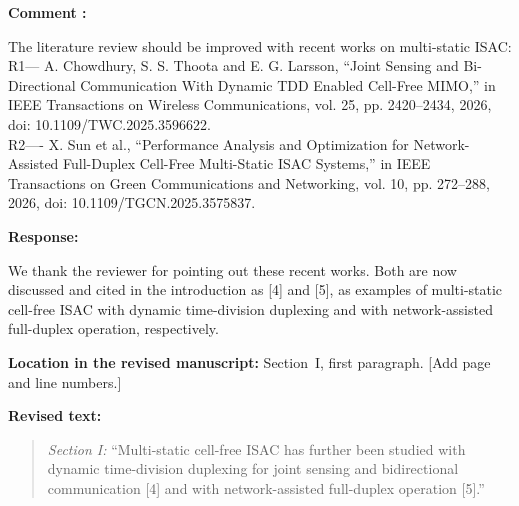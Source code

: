 \documentclass[a4paper,12pt]{article}
\newcounter{reviewcomment}
\newenvironment{reviewcomment}{%
  \stepcounter{reviewcomment}%
  \begin{shaded}
  \textbf{Comment \thereviewcomment:}\par
}{\end{shaded}}
\newenvironment{response}{\par\textbf{Response:}\par}{\par}
\newcommand{\revisionlocation}[1]{\par\textbf{Location in the revised manuscript:} #1\par}
\newenvironment{revisedtext}{%
  \par\textbf{Revised text:}\begin{quote}\color{red}
}{\end{quote}}
\begin{document}
\begin{reviewcomment}
The literature review should be improved with recent works on multi-static
ISAC:\\
R1--- A. Chowdhury, S. S. Thoota and E. G. Larsson, ``Joint Sensing and
Bi-Directional Communication With Dynamic TDD Enabled Cell-Free MIMO,'' in
IEEE Transactions on Wireless Communications, vol. 25, pp. 2420--2434, 2026,
doi: 10.1109/TWC.2025.3596622.\\
R2---- X. Sun et al., ``Performance Analysis and Optimization for
Network-Assisted Full-Duplex Cell-Free Multi-Static ISAC Systems,'' in IEEE
Transactions on Green Communications and Networking, vol. 10, pp. 272--288,
2026, doi: 10.1109/TGCN.2025.3575837.
\end{reviewcomment}
\begin{response}
We thank the reviewer for pointing out these recent works. Both are now
discussed and cited in the introduction as [4] and [5], as examples of
multi-static cell-free ISAC with dynamic time-division duplexing and with
network-assisted full-duplex operation, respectively.
\end{response}
\revisionlocation{Section~I, first paragraph. [Add page and line numbers.]}
\begin{revisedtext}
\textit{Section I:} ``Multi-static cell-free ISAC has further been studied
with dynamic time-division duplexing for joint sensing and bidirectional
communication [4] and with network-assisted full-duplex operation [5].''
\end{revisedtext}
\end{document}
